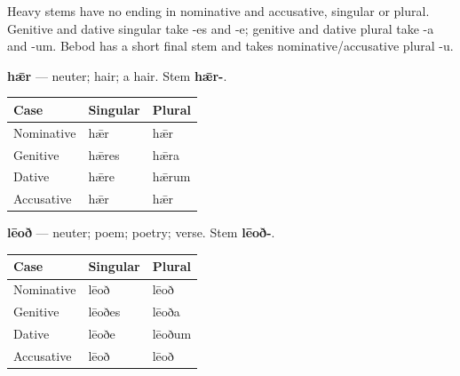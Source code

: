 Heavy stems have no ending in nominative and accusative, singular or plural. Genitive and dative singular take -es and -e; genitive and dative plural take -a and -um. Bebod has a short final stem and takes nominative/\allowbreak{}accusative plural -u.

\textbf{hǣr} — neuter; hair; a hair. Stem \textbf{hǣr-}.

\par\begingroup
\fontsize{10.5}{13.2}\selectfont
\setlength{\LTleft}{0pt}\setlength{\LTright}{\fill}
\noindent
\begin{tabular}{@{}>{\raggedright\arraybackslash}p{39.46mm}>{\raggedright\arraybackslash}p{39.46mm}>{\raggedright\arraybackslash}p{39.46mm}@{}}
\toprule
\textbf{Case} & \textbf{Singular} & \textbf{Plural} \\
\midrule
Nominative & hǣr & hǣr \\
Genitive & hǣres & hǣra \\
Dative & hǣre & hǣrum \\
Accusative & hǣr & hǣr \\
\bottomrule
\end{tabular}
\par\endgroup

\textbf{lēoð} — neuter; poem; poetry; verse. Stem \textbf{lēoð-}.

\par\begingroup
\fontsize{10.5}{13.2}\selectfont
\setlength{\LTleft}{0pt}\setlength{\LTright}{\fill}
\noindent
\begin{tabular}{@{}>{\raggedright\arraybackslash}p{39.46mm}>{\raggedright\arraybackslash}p{39.46mm}>{\raggedright\arraybackslash}p{39.46mm}@{}}
\toprule
\textbf{Case} & \textbf{Singular} & \textbf{Plural} \\
\midrule
Nominative & lēoð & lēoð \\
Genitive & lēoðes & lēoða \\
Dative & lēoðe & lēoðum \\
Accusative & lēoð & lēoð \\
\bottomrule
\end{tabular}
\par\endgroup

